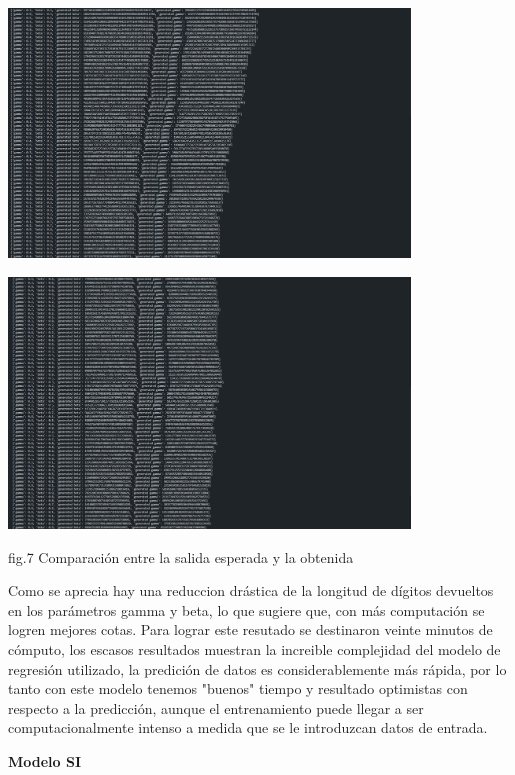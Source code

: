     \begin{center}
        
        \includegraphics[width=0.8\textwidth]{images/1.png}

        \includegraphics[width=0.8\textwidth]{images/2.png}
        
        \begin{center}
            fig.7 Comparación entre la salida esperada y la obtenida
        \end{center} 

\end{center}

Como se aprecia hay una reduccion drástica de la longitud de dígitos devueltos en los parámetros gamma y beta, lo que sugiere que, con más computación se logren 
mejores cotas. Para lograr este resutado se destinaron veinte minutos de cómputo, los escasos resultados muestran la increible 
complejidad del modelo de regresión utilizado, la predición de datos es considerablemente más rápida, por lo tanto con este modelo tenemos "buenos" tiempo 
y resultado optimistas con respecto a la predicción, aunque el entrenamiento puede llegar a ser computacionalmente intenso a medida que se le introduzcan datos de entrada.

\textbf{Modelo SI} \\

